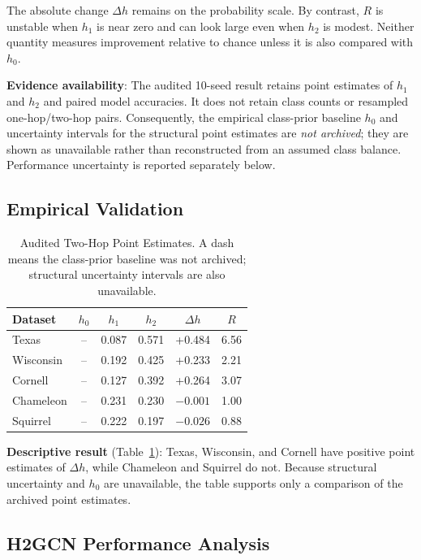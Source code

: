 The absolute change $\Delta h$ remains on the probability scale. By contrast, $R$ is unstable when $h_1$ is near zero and can look large even when $h_2$ is modest. Neither quantity measures improvement relative to chance unless it is also compared with $h_0$.

\textbf{Evidence availability}: The audited 10-seed result retains point estimates of $h_1$ and $h_2$ and paired model accuracies. It does not retain class counts or resampled one-hop/two-hop pairs. Consequently, the empirical class-prior baseline $h_0$ and uncertainty intervals for the structural point estimates are \emph{not archived}; they are shown as unavailable rather than reconstructed from an assumed class balance. Performance uncertainty is reported separately below.

\subsection{Empirical Validation}

\begin{table}[t]
\centering
\caption{Audited Two-Hop Point Estimates. A dash means the class-prior baseline was not archived; structural uncertainty intervals are also unavailable.}
\label{tab:2hop}
\small
\begin{tabular}{@{}lccccc@{}}
\toprule
Dataset & $h_0$ & $h_1$ & $h_2$ & $\Delta h$ & $R$ \\
\midrule
Texas & -- & 0.087 & 0.571 & +0.484 & 6.56 \\
Wisconsin & -- & 0.192 & 0.425 & +0.233 & 2.21 \\
Cornell & -- & 0.127 & 0.392 & +0.264 & 3.07 \\
Chameleon & -- & 0.231 & 0.230 & $-0.001$ & 1.00 \\
Squirrel & -- & 0.222 & 0.197 & $-0.026$ & 0.88 \\
\bottomrule
\end{tabular}
\end{table}

\textbf{Descriptive result} (Table~\ref{tab:2hop}): Texas, Wisconsin, and Cornell have positive point estimates of $\Delta h$, while Chameleon and Squirrel do not. Because structural uncertainty and $h_0$ are unavailable, the table supports only a comparison of the archived point estimates.

\subsection{H2GCN Performance Analysis}

